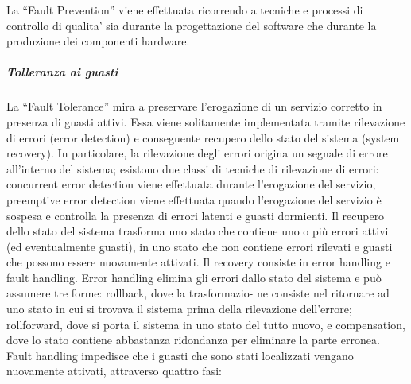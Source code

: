 \documentclass[14pt]{extarticle}
\begin{document}
La “Fault Prevention” viene effettuata ricorrendo a tecniche e processi di controllo di qualita’ sia durante la progettazione del software che durante la produzione dei componenti hardware.
\subparagraph{Tolleranza ai guasti}
La “Fault Tolerance” mira a preservare l’erogazione di un servizio corretto in
presenza di guasti attivi. Essa viene solitamente implementata tramite rilevazione di errori (error detection) e conseguente recupero dello stato del sistema
(system recovery). In particolare, la rilevazione degli errori origina un segnale
di errore all’interno del sistema; esistono due classi di tecniche di rilevazione
di errori: concurrent error detection viene effettuata durante l’erogazione del
servizio, preemptive error detection viene effettuata quando l’erogazione del
servizio è sospesa e controlla la presenza di errori latenti e guasti dormienti.
Il recupero dello stato del sistema trasforma uno stato che contiene uno o più
errori attivi (ed eventualmente guasti), in uno stato che non contiene errori
rilevati e guasti che possono essere nuovamente attivati. Il recovery consiste
in error handling e fault handling. Error handling elimina gli errori dallo
stato del sistema e può assumere tre forme: rollback, dove la trasformazio-
ne consiste nel ritornare ad uno stato in cui si trovava il sistema prima della
rilevazione dell’errore; rollforward, dove si porta il sistema in uno stato del
tutto nuovo, e compensation, dove lo stato contiene abbastanza ridondanza
per eliminare la parte erronea. Fault handling impedisce che i guasti che sono
stati localizzati vengano nuovamente attivati, attraverso quattro fasi:
\end{document}
